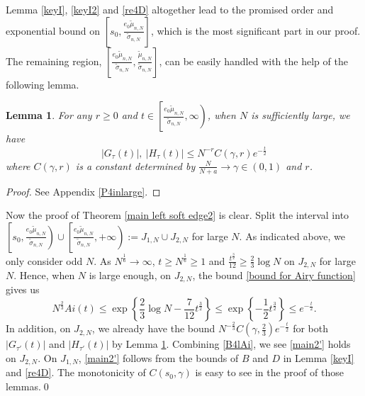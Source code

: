 \documentclass[11pt]{article}
\newtheorem{lemma}[theorem]{Lemma}
\numberwithin{equation}{section}%
\numberwithin{theorem}{section}
\begin{document}
Lemma \ref{keyI}, \ref{keyI2} and \ref{re4D} altogether lead to the promised order and exponential bound on $\left[s_0,\frac{e_0\tilde{\mu}_{n,N}}{\tilde{\sigma}_{n,N}}\right]$, which is the most significant part in our proof. The remaining region, $\left[\frac{e_0\tilde{\mu}_{n,N}}{\tilde{\sigma}_{n,N}},\frac{\tilde{\mu}_{n,N}}{\tilde{\sigma}_{n,N}}\right]$, can be easily handled with the help of the following lemma.

\begin{lemma}\label{inlarge}
    For any $r\ge0$ and $t\in\left[\frac{e_0\tilde{\mu}_{n,N}}{\tilde{\sigma}_{n,N}},\infty\right)$, when $N$ is sufficiently large, we have
    \begin{equation*}
        |G_{\tau}(t)|,~|H_{\tau}(t)|\le N^{-r}C(\gamma,r)e^{-\frac{t}{2}}
    \end{equation*}
    where $C(\gamma,r)$ is a constant determined by $\frac{N}{N+a}\rightarrow\gamma\in(0,1)$ and $r$.
\end{lemma}
\begin{proof}
    See Appendix \ref{P4inlarge}.
\end{proof}

Now the proof of Theorem \ref{main left soft edge2} is clear.
\medbreak{}\enspace
    Split the interval into $\left[s_0,\frac{e_0\tilde{\mu}_{n,N}}{\tilde{\sigma}_{n,N}}\right)\cup\left[\frac{e_0\tilde{\mu}_{n,N}}{\tilde{\sigma}_{n,N}},+\infty\right):=J_{1,N}\cup J_{2,N}$ for large $N$. As indicated above, we only consider odd $N$.
As $N^\frac{1}{6}\rightarrow\infty$, $t\ge N^\frac{1}{6}\ge 1$ and $\frac{t^\frac{3}{2}}{12}\ge\frac{2}{3}\log N$ on $J_{2,N}$ for large $N$. Hence, when $N$ is large enough, on $J_{2,N}$, the bound \eqref{bound for Airy function} gives us
      \begin{equation}\label{B4lAi}
       N^\frac{2}{3} Ai(t)\le\exp\left\{\frac{2}{3}\log N-\frac{7}{12}t^\frac{3}{2}\right\}\le \exp\left\{-\frac{1}{2}t^\frac{3}{2}\right\}\le e^{-\frac{t}{2}}.
    \end{equation}
    In addition, on $J_{2,N}$, we already have the bound $N^{-\frac{2}{3}}C\left(\gamma,\frac{2}{3}\right)e^{-\frac{t}{2}}$ for both $|G_{\tau'}(t)|$ and $|H_{\tau'}(t)|$ by Lemma \ref{inlarge}. Combining \eqref{B4lAi}, we see \eqref{main2'} holds on $J_{2,N}$. On $J_{1,N}$, \eqref{main2'} follows from the bounds of $B$ and $D$ in Lemma \ref{keyI} and \ref{re4D}. The monotonicity of $C(s_0,\gamma)$ is easy to see in the proof of those lemmas.\qed
\end{document}

